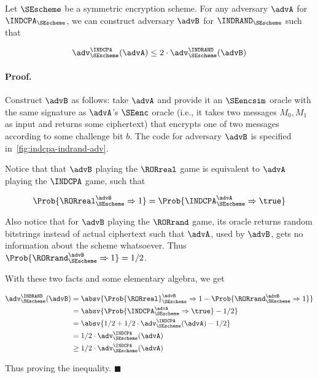 \begin{theorem}
\label{thm:reduct-indcpa-indrand}

Let $\SEscheme$ be a symmetric encryption scheme. For any adversary $\advA$ for
  $\INDCPA_\SEscheme$, we can construct adversary $\advB$ for
  $\INDRAND_\SEscheme$ such that

$$
\adv^{\INDCPA}_{\SEscheme}(\advA) \leq 2 \cdot \adv^{\INDRAND}_{\SEscheme}(\advB)
$$
\end{theorem}

\paragraph{Proof.}
Construct $\advB$ as follows: take $\advA$ and provide it an $\SEencsim$
oracle with the same signature as $\advA$'s $\SEenc$ oracle (i.e., it takes two
messages $M_0, M_1$ as input and returns some ciphertext) that encrypts one
of two messages according to some challenge bit $b$. The code for adversary
$\advB$ is specified in~\cref{fig:indcpa-indrand-adv}.

Notice that that $\advB$ playing the $\RORreal$ game is equivalent to 
$\advA$ playing the $\INDCPA$ game, such that

$$
\Prob{\RORreal_{\SEscheme}^{\advB} \Rightarrow 1} =
\Prob{\INDCPA_{\SEscheme}^{\advA} \Rightarrow \true}
$$

Also notice that for $\advB$ playing the $\RORrand$ game, its oracle returns
random bitstrings instead of actual ciphertext such that $\advA$, used by
$\advB$, gets no information about the scheme whatsoever.  Thus
$\Prob{\RORrand_{\SEscheme}^{\advB} \Rightarrow 1} = 1/2$.

With these two facts and some elementary algebra, we get

\begin{align*}
  \adv^{\INDRAND}_{\SEscheme}(\advB) &=
    \absv{\Prob{\RORreal}^{\advB}_{\SEscheme} \Rightarrow 1 - 
          \Prob{\RORrand^{\advB}_{\SEscheme} \Rightarrow 1}} \\
  &= \absv{\Prob{\INDCPA^{\advA}_{\SEscheme} \Rightarrow \true} - 1 / 2} \\
  &= \absv{1 / 2 + 1 / 2 \cdot \adv^{\INDCPA}_{\SEscheme}(\advA) - 1 / 2} \\
  &= 1 / 2 \cdot \adv^{\INDCPA}_{\SEscheme}(\advA) \\
  &\geq 1 / 2 \cdot \adv^{\INDCPA}_{\SEscheme}(\advA)
\end{align*}

Thus proving the inequality. $\blacksquare$

